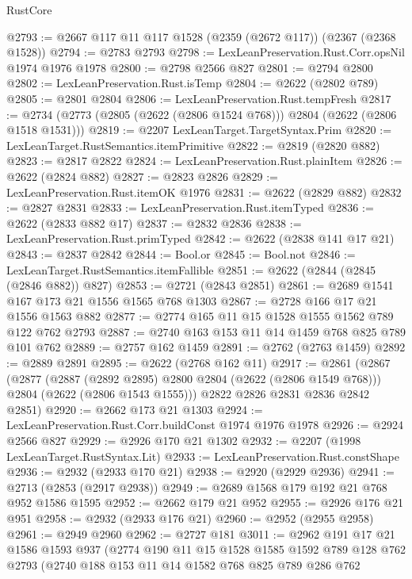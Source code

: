 \begin{lexlean}{RustCore}
\begin{coremodule}
@2793 := @2667 @117 @11 @117 @1528 (@2359 (@2672 @117)) (@2367 (@2368 @1528))
@2794 := @2783 @2793
@2798 := LexLeanPreservation.Rust.Corr.opsNil @1974 @1976 @1978
@2800 := @2798 @2566 @827
@2801 := @2794 @2800
@2802 := LexLeanPreservation.Rust.isTemp
@2804 := @2622 (@2802 @789)
@2805 := @2801 @2804
@2806 := LexLeanPreservation.Rust.tempFresh
@2817 := @2734 (@2773 (@2805 (@2622 (@2806 @1524 @768))) @2804 (@2622 (@2806 @1518 @1531)))
@2819 := @2207 LexLeanTarget.TargetSyntax.Prim
@2820 := LexLeanTarget.RustSemantics.itemPrimitive
@2822 := @2819 (@2820 @882)
@2823 := @2817 @2822
@2824 := LexLeanPreservation.Rust.plainItem
@2826 := @2622 (@2824 @882)
@2827 := @2823 @2826
@2829 := LexLeanPreservation.Rust.itemOK @1976
@2831 := @2622 (@2829 @882)
@2832 := @2827 @2831
@2833 := LexLeanPreservation.Rust.itemTyped
@2836 := @2622 (@2833 @882 @17)
@2837 := @2832 @2836
@2838 := LexLeanPreservation.Rust.primTyped
@2842 := @2622 (@2838 @141 @17 @21)
@2843 := @2837 @2842
@2844 := Bool.or
@2845 := Bool.not
@2846 := LexLeanTarget.RustSemantics.itemFallible
@2851 := @2622 (@2844 (@2845 (@2846 @882)) @827)
@2853 := @2721 (@2843 @2851)
@2861 := @2689 @1541 @167 @173 @21 @1556 @1565 @768 @1303
@2867 := @2728 @166 @17 @21 @1556 @1563 @882
@2877 := @2774 @165 @11 @15 @1528 @1555 @1562 @789 @122 @762 @2793
@2887 := @2740 @163 @153 @11 @14 @1459 @768 @825 @789 @101 @762
@2889 := @2757 @162 @1459
@2891 := @2762 (@2763 @1459)
@2892 := @2889 @2891
@2895 := @2622 (@2768 @162 @11)
@2917 := @2861
    (@2867
      (@2877
        (@2887 (@2892 @2895) @2800 @2804 (@2622 (@2806 @1549 @768)))
        @2804
        (@2622 (@2806 @1543 @1555)))
      @2822
      @2826
      @2831
      @2836
      @2842
      @2851)
@2920 := @2662 @173 @21 @1303
@2924 := LexLeanPreservation.Rust.Corr.buildConst @1974 @1976 @1978
@2926 := @2924 @2566 @827
@2929 := @2926 @170 @21 @1302
@2932 := @2207 (@1998 LexLeanTarget.RustSyntax.Lit)
@2933 := LexLeanPreservation.Rust.constShape
@2936 := @2932 (@2933 @170 @21)
@2938 := @2920 (@2929 @2936)
@2941 := @2713 (@2853 (@2917 @2938))
@2949 := @2689 @1568 @179 @192 @21 @768 @952 @1586 @1595
@2952 := @2662 @179 @21 @952
@2955 := @2926 @176 @21 @951
@2958 := @2932 (@2933 @176 @21)
@2960 := @2952 (@2955 @2958)
@2961 := @2949 @2960
@2962 := @2727 @181
@3011 := @2962
    @191
    @17
    @21
    @1586
    @1593
    @937
    (@2774
      @190
      @11
      @15
      @1528
      @1585
      @1592
      @789
      @128
      @762
      @2793
      (@2740
        @188
        @153
        @11
        @14
        @1582
        @768
        @825
        @789
        @286
        @762

\end{coremodule}
\end{lexlean}
